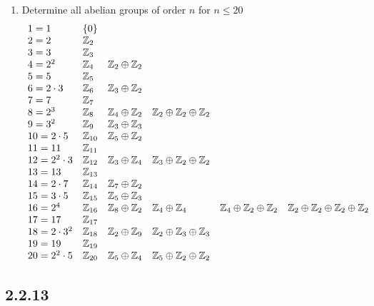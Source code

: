 \documentclass[letterpaper,12pt,fleqn]{article}
\begin{document}
\begin{enumerate}[label={\alph*)}]
\item Determine all abelian groups of order $n$ for $n\le20$
  \[\begin{array}{llllll}
  1=1 & \{0\}\\
  2=2 & \mathbb{Z}_2 \\
  3=3 & \mathbb{Z}_3 \\
  4=2^2 & \mathbb{Z}_4 & \mathbb{Z}_2\oplus\mathbb{Z}_2 \\
  5=5 & \mathbb{Z}_5 \\
  6=2\cdot3 & \mathbb{Z}_6 & \mathbb{Z}_3\oplus\mathbb{Z}_2 \\
  7=7 & \mathbb{Z}_7 \\
  8=2^3 & \mathbb{Z}_8 & \mathbb{Z}_4\oplus\mathbb{Z}_2 & \mathbb{Z}_2\oplus\mathbb{Z}_2\oplus\mathbb{Z}_2 \\
  9=3^2 & \mathbb{Z}_9 & \mathbb{Z}_3\oplus\mathbb{Z}_3 \\
  10=2\cdot5 & \mathbb{Z}_{10} & \mathbb{Z}_5\oplus\mathbb{Z}_2 \\
  11=11 & \mathbb{Z}_{11} \\
  12=2^2\cdot3 & \mathbb{Z}_{12} & \mathbb{Z}_3\oplus\mathbb{Z}_4 & \mathbb{Z}_3\oplus\mathbb{Z}_2\oplus\mathbb{Z}_2 \\
  13=13 & \mathbb{Z}_{13} \\
  14=2\cdot7 & \mathbb{Z}_{14} & \mathbb{Z}_7\oplus\mathbb{Z}_2 \\
  15=3\cdot5 & \mathbb{Z}_{15} & \mathbb{Z}_5\oplus\mathbb{Z}_3 \\
  16=2^4 & \mathbb{Z}_{16} & \mathbb{Z}_8\oplus\mathbb{Z}_2 & \mathbb{Z}_4\oplus\mathbb{Z}_4 & \mathbb{Z}_4\oplus\mathbb{Z}_2\oplus\mathbb{Z}_2 &
  \mathbb{Z}_2\oplus\mathbb{Z}_2\oplus\mathbb{Z}_2\oplus\mathbb{Z}_2 \\
  17=17 & \mathbb{Z}_{17} \\
  18=2\cdot3^2 & \mathbb{Z}_{18} & \mathbb{Z}_2\oplus\mathbb{Z}_9 & \mathbb{Z}_2\oplus\mathbb{Z}_3\oplus\mathbb{Z}_3 \\
  19=19 & \mathbb{Z}_{19} \\
  20=2^2\cdot5 & \mathbb{Z}_{20} & \mathbb{Z}_5\oplus\mathbb{Z}_4 & \mathbb{Z}_5\oplus\mathbb{Z}_2\oplus\mathbb{Z}_2
  \end{array}\]
\end{enumerate}

\subsection*{2.2.13}
\end{document}
